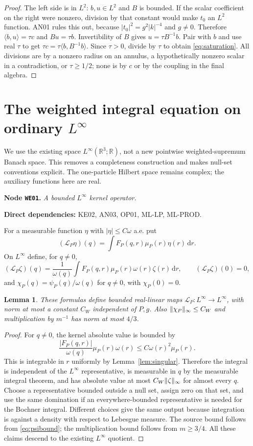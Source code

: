\documentclass[11pt,a4paper]{article}
\newtheorem{lemma}[theorem]{Lemma}
\theoremstyle{remark}\newtheorem{remark}[theorem]{Remark}
\newcommand{\R}{\mathbb R}\newcommand{\C}{\mathbb C}\newcommand{\N}{\mathbb N}
\newcommand{\abs}[1]{\lvert #1\rvert}\newcommand{\rankone}[2]{\lvert #1\rangle\langle #2\rvert}
\newcommand{\dd}{\,\mathrm d}\newcommand{\almosteverywhere}{\text{a.e.}}
\newcommand{\node}[3]{\par\Needspace{6\baselineskip}\smallskip\hypertarget{node:#1}{}\label{nodepage:#1}\noindent\textbf{Node \texttt{#1}.} \textit{#2.}\par\noindent\textbf{Direct dependencies:} #3.\par}
\begin{document}
\begin{proof}
The left side is in $L^2$: $b,u\in L^2$ and $B$ is bounded. If the scalar coefficient on the right were nonzero, division by that constant would make $t_0$ an $L^2$ function. AN01 rules this out, because $|t_0|^2=g^2|k|^{-4}$ and $g\ne0$. Therefore $\langle b,u\rangle=\tau c$ and $Bu=\tau b$. Invertibility of $B$ gives $u=\tau B^{-1}b$. Pair with $b$ and use real $\tau$ to get
$\tau c=\tau\langle b,B^{-1}b\rangle$. Since $\tau>0$, divide by $\tau$ to obtain \eqref{eq:saturation}. All divisions are by a nonzero radius on an annulus, a hypothetically nonzero scalar in a contradiction, or $\tau\geq1/2$; none is by $c$ or by the coupling in the final algebra.
\end{proof}


\section{The weighted integral equation on ordinary \texorpdfstring{$L^\infty$}{L infinity}}\label{sec:weighted}
We use the existing space $L^\infty(\R^3;\R)$, not a new pointwise weighted-supremum Banach space. This removes a completeness construction and makes null-set conventions explicit. The one-particle Hilbert space remains complex; the auxiliary functions here are real.

\node{WE01}{A bounded $L^\infty$ kernel operator}{KE02, AN03, OP01, ML-LP, ML-PROD}
For a measurable function $\eta$ with $\abs\eta\leq C\omega$ a.e. put
\[
 (\mathcal L_P\eta)(q)=\int F_P(q,r)\mu_P(r)\eta(r)\dd r.
\]
On $L^\infty$ define, for $q\ne0$,
\[
 (\mathscr L_P\zeta)(q)=\frac1{\omega(q)}
       \int F_P(q,r)\mu_P(r)\omega(r)\zeta(r)\dd r,
 \qquad (\mathscr L_P\zeta)(0)=0,
\]
and $\chi_P(q)=\psi_P(q)/\omega(q)$ for $q\ne0$, with $\chi_P(0)=0$.

\begin{lemma}\label{lem:Linftyoperator}
These formulas define bounded real-linear maps $\mathscr L_P:L^\infty\to L^\infty$, with norm at most a constant $C_W$ independent of $P,g$. Also $\lVert \chi_P\rVert_\infty\leq C_W$ and multiplication by $m^{-1}$ has norm at most $4/3$.
\end{lemma}
\begin{proof}
For $q\ne0$, the kernel absolute value is bounded by
\[
 \frac{\abs{F_P(q,r)}}{\omega(q)}\mu_P(r)\omega(r)
 \leq C\omega(r)^2\mu_P(r).
\]
This is integrable in $r$ uniformly by Lemma~\ref{lem:singular}. Therefore the integral is independent of the $L^\infty$ representative, is measurable in $q$ by the measurable integral theorem, and has absolute value at most $C_W\lVert \zeta\rVert_\infty$ for almost every $q$. Choose a representative bounded outside a null set, assign zero on that set, and use the same domination if an everywhere-bounded representative is needed for the Bochner integral. Different choices give the same output because integration is against a density with respect to Lebesgue measure. The source bound follows from \eqref{eq:psibound}; the multiplication bound follows from $m\geq3/4$. All these claims descend to the existing $L^\infty$ quotient.
\end{proof}
\end{document}
